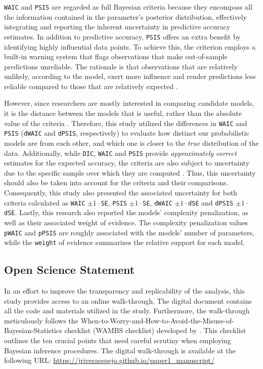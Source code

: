 \documentclass[
  authoryear,
  preprint,
  1p]{elsarticle}
\begin{document}
\texttt{WAIC} and \texttt{PSIS} are regarded as full Bayesian criteria
because they encompass all the information contained in the parameter's
posterior distribution, effectively integrating and reporting the
inherent uncertainty in predictive accuracy estimates. In addition to
predictive accuracy, \texttt{PSIS} offers an extra benefit by
identifying highly influential data points. To achieve this, the
criterion employs a built-in warning system that flags observations that
make out-of-sample predictions unreliable. The rationale is that
observations that are relatively unlikely, according to the model, exert
more influence and render predictions less reliable compared to those
that are relatively expected \citep{McElreath_2020}.

However, since researchers are mostly interested in comparing candidate
models, it is the distance between the models that is useful, rather
than the absolute value of the criteria
\citep[see][209, 223-224]{McElreath_2020}. Therefore, this study
utilized the differences in \texttt{WAIC} and \texttt{PSIS}
(\texttt{dWAIC} and \texttt{dPSIS}, respectively) to evaluate how
distinct our probabilistic models are from each other, and which one is
closer to the \emph{true} distribution of the data. Additionally, while
\texttt{DIC}, \texttt{WAIC} and \texttt{PSIS} provide
\emph{approximately correct} estimates for the expected accuracy, the
criteria are also subject to uncertainty due to the specific sample over
which they are computed \citep[see][223]{McElreath_2020}. Thus, this
uncertainty should also be taken into account for the criteria and their
comparisons. Consequently, this study also presented the associated
uncertainty for both criteria calculated as \texttt{WAIC}
\(\pm 1 \cdot\)\texttt{SE}, \texttt{PSIS} \(\pm 1 \cdot\)\texttt{SE},
\texttt{dWAIC} \(\pm 1 \cdot\)\texttt{dSE} and \texttt{dPSIS}
\(\pm 1 \cdot\)\texttt{dSE}. Lastly, this research also reported the
models' complexity penalization, as well as their associated weight of
evidence. The complexity penalization values \texttt{pWAIC} and
\texttt{pPSIS} are roughly associated with the models' number of
parameters, while the \texttt{weight} of evidence summarizes the
relative support for each model.

\subsection{Open Science Statement}\label{sec-M-SM-OS}

In an effort to improve the transparency and replicability of the
analysis, this study provides access to an online walk-through. The
digital document contains all the code and materials utilized in the
study. Furthermore, the walk-through meticulously follows the
When-to-Worry-and-How-to-Avoid-the-Misuse-of-Bayesian-Statistics
checklist (WAMBS checklist) developed by \citet{Depaoli_et_al_2017}.
This checklist outlines the ten crucial points that need careful
scrutiny when employing Bayesian inference procedures. The digital
walk-through is available at the following URL:
\url{https://jriveraespejo.github.io/paper1_manuscript/}
\end{document}
